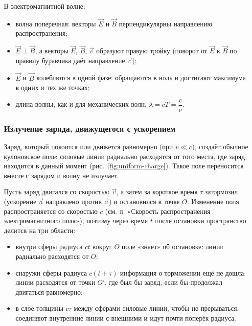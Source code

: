 \documentclass[12pt]{article}
\begin{document}
	\begin{statement}
		В электромагнитной волне:
		\begin{itemize}
			\item волна поперечная: векторы $\vec{E}$ и $\vec{B}$ перпендикулярны направлению распространения;
			\item $\vec{E} \perp \vec{B}$, а векторы $\vec{E}$, $\vec{B}$, $\vec{c}$ образуют правую тройку (поворот от $\vec{E}$ к $\vec{B}$ по правилу буравчика даёт направление $\vec{c}$);
			\item $\vec{E}$ и $\vec{B}$ колеблются в одной фазе: обращаются в ноль и достигают максимума в одних и тех же точках;
			\item длина волны, как и для механических волн, $\lambda = cT = \dfrac{c}{\nu}$.
		\end{itemize}
	\end{statement}

	\subsubsection{Излучение заряда, движущегося с ускорением}

	Заряд, который покоится или движется равномерно (при $v \ll c$), создаёт обычное кулоновское поле: силовые линии радиально расходятся от того места, где заряд находится в данный момент (рис.~\ref{fig:uniform-charge}). Такое поле переносится вместе с зарядом и волну не излучает.

	Пусть заряд двигался со скоростью $\vec{v}$, а затем за короткое время $\tau$ затормозил (ускорение $\vec{a}$ направлено против $\vec{v}$) и остановился в точке $O$. Изменение поля распространяется со скоростью $c$ (см. п. «Скорость распространения электромагнитного поля»), поэтому через время $t$ после остановки пространство делится на три области:
	\begin{itemize}
		\item внутри сферы радиуса $c t$ вокруг $O$ поле «знает» об остановке: линии радиально расходятся от $O$;
		\item снаружи сферы радиуса $c (t + \tau)$ информация о торможении ещё не дошла: линии расходятся от точки $O'$, где был бы заряд, если бы продолжал двигаться равномерно;
		\item в слое толщины $c \tau$ между сферами силовые линии, чтобы не прерываться, соединяют внутренние линии с внешними и идут почти поперёк радиуса.
	\end{itemize}
\end{document}
